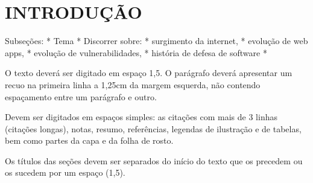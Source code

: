 \chapter{INTRODUÇÃO}

Subseções:
* Tema
* 
Discorrer sobre:
* surgimento da internet, 
* evolução de web apps,
* evolução de vulnerabilidades,
* história de defesa de software
* 

O texto deverá ser digitado em espaço 1,5. O parágrafo deverá apresentar um recuo na primeira linha a 1,25cm da margem
esquerda, não contendo espaçamento entre um parágrafo e outro. 

Devem ser digitados em espaços simples: as citações com mais de 3 linhas (citações longas), notas, resumo, referências, legendas de ilustração e de tabelas, bem como partes da capa e da folha de rosto. 

Os títulos das seções devem ser separados do início do texto que os precedem ou os sucedem por um espaço (1,5).

\bigskip
